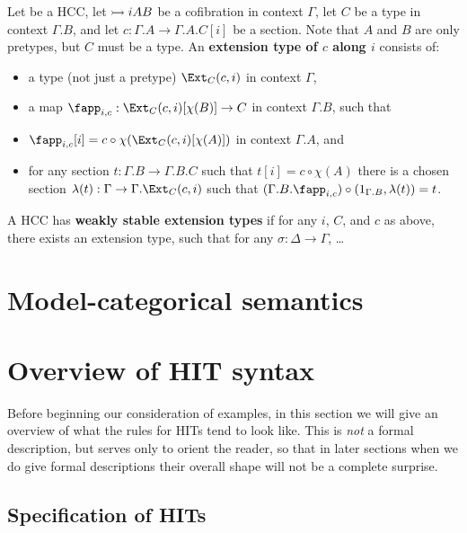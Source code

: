 \documentclass{amsart}
\begin{document}
\begin{definition}
  Let \E be a HCC, let $\rightarrowtail{i}{A}{B}$ be a cofibration in context $\Gamma$, let $C$ be a type in context $\Gamma.B$, and let $c:\Gamma.A \to \Gamma.A.C[i]$ be a section.
  Note that $A$ and $B$ are only pretypes, but $C$ must be a type.
  An \textbf{extension type of $c$ along $i$} consists of:
  \begin{itemize}
  \item a type (not just a pretype) $\Ext_{C}(c,i)$ in context $\Gamma$,
  \item a map $\fapp_{i,c} : \Ext_C(c,i)[\chi(B)] \to C$ in context $\Gamma.B$, such that
  \item $\fapp_{i,c}[i] = c \circ \chi(\Ext_C(c,i)[\chi(A)])$ in context $\Gamma.A$, and
  \item for any section $t:\Gamma.B \to \Gamma.B.C$ such that $t[i] = c\circ \chi(A)$ there is a chosen section $\lambda(t) : \Gamma \to \Gamma.\Ext_C(c,i)$ such that $(\Gamma.B.\fapp_{i,c}) \circ (1_{\Gamma.B},\lambda(t)) = t$.
  \end{itemize}
\end{definition}

\begin{definition}
  A HCC \E has \textbf{weakly stable extension types} if for any $i$, $C$, and $c$ as above, there exists an extension type, such that for any $\sigma:\Delta\to\Gamma$, \dots
\end{definition}


\section{Model-categorical semantics}
\label{sec:model-categories}



\section{Overview of HIT syntax}
\label{sec:syntax}

Before beginning our consideration of examples, in this section we will give an overview of what the rules for HITs tend to look like.
This is \emph{not} a formal description, but serves only to orient the reader, so that in later sections when we do give formal descriptions their overall shape will not be a complete surprise.


\subsection{Specification of HITs}
\label{sec:hit-specs}
\end{document}

